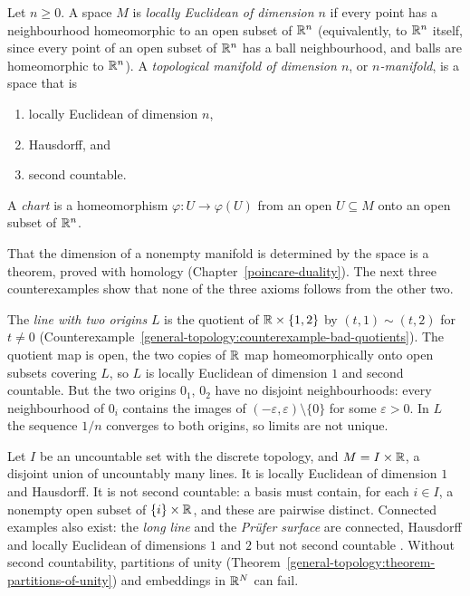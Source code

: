 \begin{definition}\label{topological-manifolds:definition-manifold}
Let $n \geq 0$. A space $M$ is \emph{locally Euclidean of dimension $n$} if every point has a neighbourhood homeomorphic to an open subset of $\mathbb{R}^n$ (equivalently, to $\mathbb{R}^n$ itself, since every point of an open subset of
$\mathbb{R}^n$ has a ball neighbourhood, and balls are homeomorphic to $\mathbb{R}^n$). A \emph{topological manifold of dimension $n$}, or \emph{$n$-manifold}, is a space that is
\begin{enumerate}
\item locally Euclidean of dimension $n$,
\item Hausdorff, and
\item second countable.
\end{enumerate}
A \emph{chart} is a homeomorphism $\varphi \colon U \to \varphi(U)$ from an open $U \subseteq M$ onto an open subset of $\mathbb{R}^n$.
\end{definition}

That the dimension of a nonempty manifold is determined by the space is a theorem, proved with homology (Chapter~\ref{poincare-duality}). The next three counterexamples show that none of the three axioms follows from the
other two.

\begin{counterexample}\label{topological-manifolds:counterexample-not-hausdorff}
The \emph{line with two origins} $L$ is the quotient of $\mathbb{R} \times \{1, 2\}$ by $(t, 1) \sim (t, 2)$ for $t \neq 0$ (Counterexample~\ref{general-topology:counterexample-bad-quotients}). The quotient map is open, the two copies of $\mathbb{R}$
map homeomorphically onto open subsets covering $L$, so $L$ is locally Euclidean of dimension $1$ and second countable. But the two origins $0_1$, $0_2$ have no disjoint neighbourhoods: every neighbourhood of $0_i$
contains the images of $(-\varepsilon, \varepsilon) \setminus \{0\}$ for some $\varepsilon > 0$. In $L$ the sequence $1/n$ converges to both origins, so limits are not unique.
\end{counterexample}

\begin{counterexample}\label{topological-manifolds:counterexample-not-second-countable}
Let $I$ be an uncountable set with the discrete topology, and $M = I \times \mathbb{R}$, a disjoint union of uncountably many lines. It is locally Euclidean of dimension $1$ and Hausdorff. It is not second countable: a basis must
contain, for each $i \in I$, a nonempty open subset of $\{i\} \times \mathbb{R}$, and these are pairwise distinct. Connected examples also exist: the \emph{long line} and the \emph{Pr\"ufer surface} are connected, Hausdorff and locally
Euclidean of dimensions $1$ and $2$ but not second countable \cite{munkres-topology}. Without second countability, partitions of unity (Theorem~\ref{general-topology:theorem-partitions-of-unity}) and embeddings in
$\mathbb{R}^N$ can fail.
\end{counterexample}

